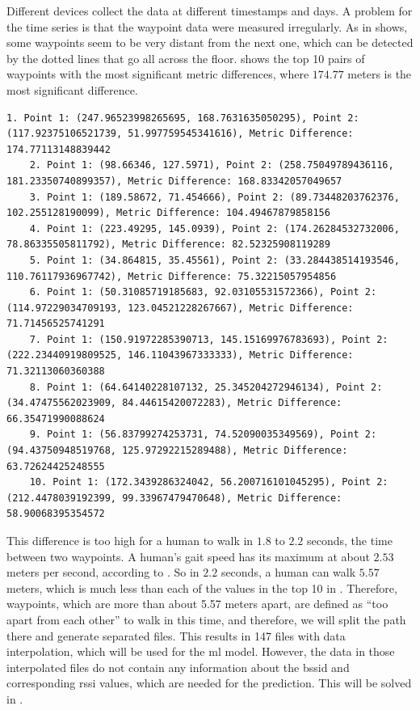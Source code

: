Different devices collect the data at different timestamps and days.
A problem for the time series is that the waypoint data were measured irregularly.
As in  shows, some waypoints seem to be very distant from the next one, which can be detected by the dotted lines that go all across the floor.
 shows the top 10 pairs of waypoints with the most significant metric differences, where \(174.77\) meters is the most significant difference.\\

\begin{lstlisting}[caption={Top 10 pairs with the most significant metric differences of data from floor F1 of site Yintai City (Chengxi Branch)},label={lst:metric-diff}]
    1. Point 1: (247.96523998265695, 168.7631635050295), Point 2: (117.92375106521739, 51.997759545341616), Metric Difference: 174.77113148839442
    2. Point 1: (98.66346, 127.5971), Point 2: (258.75049789436116, 181.23350740899357), Metric Difference: 168.83342057049657
    3. Point 1: (189.58672, 71.454666), Point 2: (89.73448203762376, 102.255128190099), Metric Difference: 104.49467879858156
    4. Point 1: (223.49295, 145.0939), Point 2: (174.26284532732006, 78.86335505811792), Metric Difference: 82.52325908119289
    5. Point 1: (34.864815, 35.45561), Point 2: (33.284438514193546, 110.76117936967742), Metric Difference: 75.32215057954856
    6. Point 1: (50.31085719185683, 92.03105531572366), Point 2: (114.97229034709193, 123.04521228267667), Metric Difference: 71.71456525741291
    7. Point 1: (150.91972285390713, 145.15169976783693), Point 2: (222.23440919809525, 146.11043967333333), Metric Difference: 71.32113060360388
    8. Point 1: (64.64140228107132, 25.345204272946134), Point 2: (34.47475562023909, 84.44615420072283), Metric Difference: 66.35471990088624
    9. Point 1: (56.83799274253731, 74.52090035349569), Point 2: (94.43750948519768, 125.97292215289488), Metric Difference: 63.72624425248555
    10. Point 1: (172.3439286324042, 56.200716101045295), Point 2: (212.4478039192399, 99.33967479470648), Metric Difference: 58.90068395354572
\end{lstlisting}

This difference is too high for a human to walk in \(1.8\) to \(2.2\) seconds, the time between two waypoints.
A human's gait speed has its maximum at about \(2.53\) meters per second, according to \cite{bohannonComfortableMaximumWalking1997}.
So in \(2.2\) seconds, a human can walk \(5.57\) meters, which is much less than each of the values in the top 10 in .
Therefore, waypoints, which are more than about 5.57 meters apart, are defined as ``too apart from each other'' to walk in this time, and therefore, we will split the path there and generate separated files.
This results in 147 files with data interpolation, which will be used for the \ac{ml} model.
However, the data in those interpolated files do not contain any information about the \ac{bssid} and corresponding \ac{rssi} values, which are needed for the prediction.
This will be solved in .



